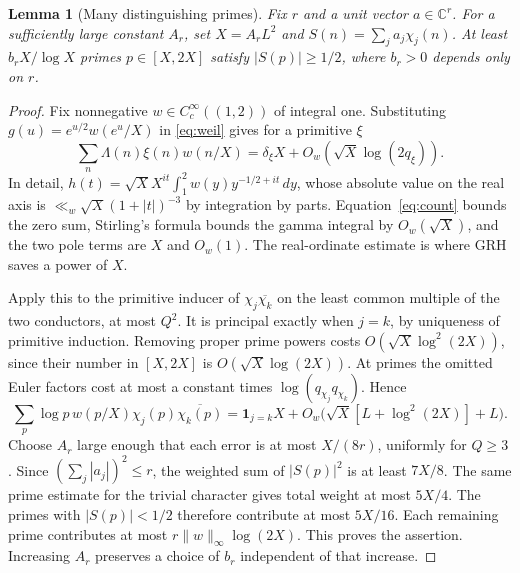 \documentclass[11pt]{article}
\newtheorem{lemma}[theorem]{Lemma}
\newcommand{\C}{\mathbb C}\newcommand{\R}{\mathbb R}\newcommand{\Q}{\mathbb Q}
\newcommand{\dd}{\,d}\newcommand{\supp}{\operatorname{supp}}
\newcommand{\one}{\mathbf1}
\begin{document}
\begin{lemma}[Many distinguishing primes]\label{lem:many}
Fix \(r\) and a unit vector \(a\in\C^r\). For a sufficiently large constant \(A_r\), set \(X=A_rL^2\) and \(S(n)=\sum_j a_j\chi_j(n)\). At least \(b_r X/\log X\) primes \(p\in[X,2X]\) satisfy \(|S(p)|\ge1/2\), where \(b_r>0\) depends only on \(r\).
\end{lemma}
\begin{proof}
Fix nonnegative \(w\in C_c^\infty((1,2))\) of integral one. Substituting \(g(u)=e^{u/2}w(e^u/X)\) in \eqref{eq:weil} gives for a primitive \(\xi\)
\[
 \sum_n\Lambda(n)\xi(n)w(n/X)=\delta_\xi X+O_w(\sqrt X\log(2q_\xi)).
\]
In detail, \(h(t)=\sqrt X X^{it}\int_1^2 w(y)y^{-1/2+it}\dd y\), whose absolute value on the real axis is \(\ll_w\sqrt X(1+|t|)^{-3}\) by integration by parts. Equation~\eqref{eq:count} bounds the zero sum, Stirling's formula bounds the gamma integral by \(O_w(\sqrt X)\), and the two pole terms are \(X\) and \(O_w(1)\). The real-ordinate estimate is where GRH saves a power of \(X\).

Apply this to the primitive inducer of \(\chi_j\overline{\chi_k}\) on the least common multiple of the two conductors, at most \(Q^2\). It is principal exactly when \(j=k\), by uniqueness of primitive induction. Removing proper prime powers costs \(O(\sqrt X\log^2(2X))\), since their number in \([X,2X]\) is \(O(\sqrt X\log(2X))\). At primes the omitted Euler factors cost at most a constant times \(\log(q_{\chi_j}q_{\chi_k})\). Hence
\[
 \sum_p \log p\,w(p/X)\chi_j(p)\overline{\chi_k(p)}
 =\one_{j=k}X+O_w\big(\sqrt X[L+\log^2(2X)]+L\big).
\]
Choose \(A_r\) large enough that each error is at most \(X/(8r)\), uniformly for \(Q\ge3\). Since \((\sum_j|a_j|)^2\le r\), the weighted sum of \(|S(p)|^2\) is at least \(7X/8\). The same prime estimate for the trivial character gives total weight at most \(5X/4\). The primes with \(|S(p)|<1/2\) therefore contribute at most \(5X/16\). Each remaining prime contributes at most \(r\|w\|_\infty\log(2X)\). This proves the assertion. Increasing \(A_r\) preserves a choice of \(b_r\) independent of that increase.
\end{proof}
\end{document}
